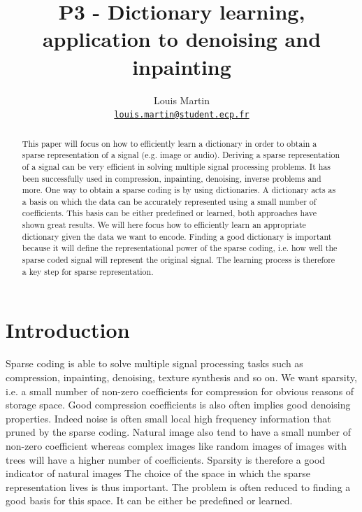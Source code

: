 \documentclass[a4paper,11pt]{article}
\title{P3 - Dictionary learning, application to denoising and inpainting}
\author{
  Louis Martin\\
  \href{mailto:louis.martin@student.ecp.fr}{\tt louis.martin@student.ecp.fr}
}
\begin{document}
\maketitle

\begin{abstract}
This paper will focus on how to efficiently learn a dictionary in order to obtain a sparse representation of a signal (e.g. image or audio).
Deriving a sparse representation of a signal can be very efficient in solving multiple signal processing problems.
It has been successfully used in compression, inpainting, denoising, inverse problems and more.
One way to obtain a sparse coding is by using dictionaries.
A dictionary acts as a basis on which the data can be accurately represented using a small number of coefficients.
This basis can be either predefined or learned, both approaches have shown great results.
We will here focus how to efficiently learn an appropriate dictionary given the data we want to encode.
Finding a good dictionary is important because it will define the representational power of the sparse coding,
i.e. how well the sparse coded signal will represent the original signal.
The learning process is therefore a key step for sparse representation.

\end{abstract}

\section{Introduction}
Sparse coding is able to solve multiple signal processing tasks such as compression, inpainting, denoising, texture synthesis and so on.
We want sparsity, i.e. a small number of non-zero coefficients for compression for obvious reasons of storage space.
Good compression coefficients is also often implies good denoising properties.
Indeed noise is often small local high frequency information that pruned by the sparse coding.
Natural image also tend to have a small number of non-zero coefficient whereas complex images like
random images of images with trees will have a higher number of coefficients.
Sparsity is therefore a good indicator of natural images
The choice of the space in which the sparse representation lives is thus important.
The problem is often reduced to finding a good basis for this space.
It can be either be predefined or learned.
\end{document}
